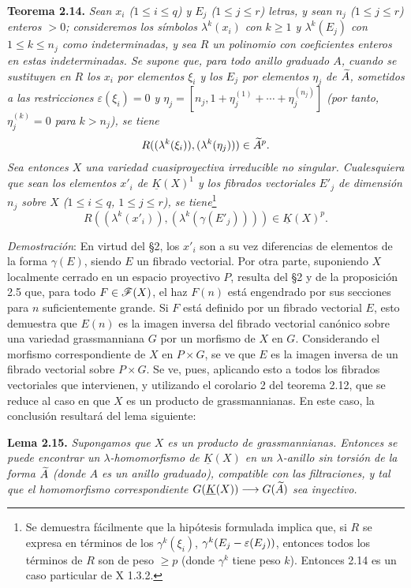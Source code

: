\textbf{Teorema 2.14.} \emph{Sean $x_i$ ($1\leq i\leq q$) y $E_j$ ($1\leq j\leq r$) letras, y sean $n_j$ ($1\leq j\leq r$) enteros $>0$; consideremos los símbolos $\lambda^k(x_i)$ con $k\geq1$ y $\lambda^k(E_j)$ con $1\leq k\leq n_j$ como indeterminadas, y sea $R$ un polinomio con coeficientes enteros en estas indeterminadas. Se supone que, para todo anillo graduado $A$, cuando se sustituyen en $R$ los $x_i$ por elementos $\xi_i$ y los $E_j$ por elementos $\eta_j$ de $\Atil$, sometidos a las restricciones $\varepsilon(\xi_i)=0$ y $\eta_j=[n_j,1+\eta_j^{(1)}+\cdots+\eta_j^{(n_j)}]$ (por tanto, $\eta_j^{(k)}=0$ para $k>n_j$), se tiene}
\[
 R((\lambda^k(\xi_i)),(\lambda^k(\eta_j)))\in\Atil^p.
\]
\emph{Sea entonces $X$ una variedad cuasiproyectiva irreducible no singular. Cualesquiera que sean los elementos $x'_i$ de $\underline K(X)^1$ y los fibrados vectoriales $E'_j$ de dimensión $n_j$ sobre $X$ ($1\leq i\leq q$, $1\leq j\leq r$), se tiene}\footnote{Se demuestra fácilmente que la hipótesis formulada implica que, si $R$ se expresa en términos de los $\gamma^k(\xi_i)$, $\gamma^k(\sisi{E_i}{E_j}-\varepsilon(\sisi{E_i}{E_j}))$, entonces todos los términos de $R$ son de peso $\geq p$ (donde $\gamma^k$ tiene peso $k$). Entonces 2.14 es un caso particular de X 1.3.2.}
\begin{equation}\tag{*}
 R((\lambda^k(x'_i)),(\lambda^k(\gamma(E'_j))))\in\underline K(X)^p.
\end{equation}

\emph{Demostración}: En virtud del \S 2, los $x'_i$ son a su vez diferencias de elementos de la forma $\gamma(E)$, siendo $E$ un fibrado vectorial. Por otra parte, suponiendo $X$ localmente cerrado en un espacio proyectivo $P$, resulta del \S 2 y de la proposición 2.5 que, para todo $F\in\cF(X)$, el haz $F(n)$ está engendrado por sus secciones para $n$ suficientemente grande. Si $F$ está definido por un fibrado vectorial $E$, esto demuestra que $E(n)$ es la imagen inversa del fibrado vectorial canónico sobre una variedad grassmanniana $G$ por un morfismo de $X$ en $G$. Considerando el morfismo correspondiente de $X$ en $P\times G$, se ve que $E$ es la imagen inversa de un fibrado vectorial sobre $P\times G$. Se ve, pues, aplicando esto a todos los fibrados vectoriales que intervienen, y utilizando el corolario 2 del teorema 2.12, que se reduce al caso en que $X$ es un producto de grassmannianas. En este caso, la conclusión resultará del lema siguiente:

\textbf{Lema 2.15.} \emph{Supongamos que $X$ es un producto de grassmannianas. Entonces se puede encontrar un $\lambda$-homomorfismo de $\underline K(X)$ en un $\lambda$-anillo sin torsión de la forma $\Atil$ (donde $A$ es un anillo graduado), compatible con las filtraciones, y tal que el homomorfismo correspondiente $G(\underline K(X))\longrightarrow G(\sisi{A}{\widetilde A})$ sea inyectivo.}


